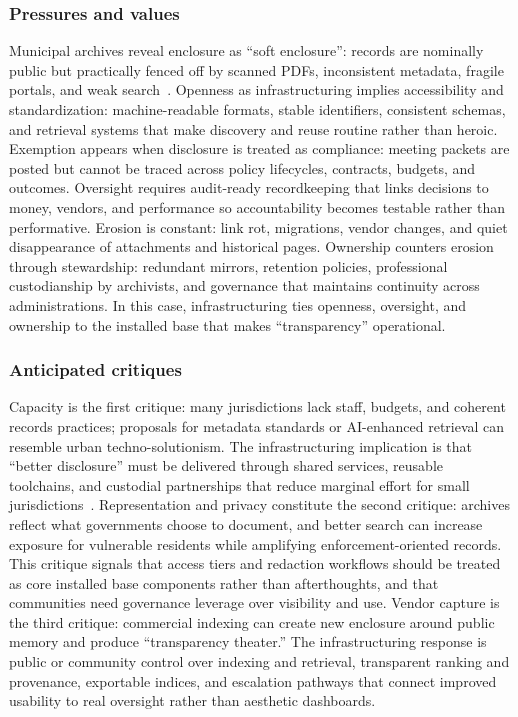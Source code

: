\documentclass[acmsmall,screen]{acmart}
\begin{document}
\subsubsection*{Pressures and values}
Municipal archives reveal enclosure as ``soft enclosure'': records are nominally public but practically fenced off by scanned PDFs, inconsistent metadata, fragile portals, and weak search~\cite{brownCouncilDataProject2021,fuNaturalLanguageProcessing2024}. Openness as infrastructuring implies accessibility and standardization: machine-readable formats, stable identifiers, consistent schemas, and retrieval systems that make discovery and reuse routine rather than heroic. Exemption appears when disclosure is treated as compliance: meeting packets are posted but cannot be traced across policy lifecycles, contracts, budgets, and outcomes. Oversight requires audit-ready recordkeeping that links decisions to money, vendors, and performance so accountability becomes testable rather than performative. Erosion is constant: link rot, migrations, vendor changes, and quiet disappearance of attachments and historical pages. Ownership counters erosion through stewardship: redundant mirrors, retention policies, professional custodianship by archivists, and governance that maintains continuity across administrations. In this case, infrastructuring ties openness, oversight, and ownership to the installed base that makes ``transparency'' operational.

\subsubsection*{Anticipated critiques}
Capacity is the first critique: many jurisdictions lack staff, budgets, and coherent records practices; proposals for metadata standards or AI-enhanced retrieval can resemble urban techno-solutionism. The infrastructuring implication is that ``better disclosure'' must be delivered through shared services, reusable toolchains, and custodial partnerships that reduce marginal effort for small jurisdictions~\cite{warrenRequestAtlasSupportingSlow2025}. Representation and privacy constitute the second critique: archives reflect what governments choose to document, and better search can increase exposure for vulnerable residents while amplifying enforcement-oriented records. This critique signals that access tiers and redaction workflows should be treated as core installed base components rather than afterthoughts, and that communities need governance leverage over visibility and use. Vendor capture is the third critique: commercial indexing can create new enclosure around public memory and produce ``transparency theater.'' The infrastructuring response is public or community control over indexing and retrieval, transparent ranking and provenance, exportable indices, and escalation pathways that connect improved usability to real oversight rather than aesthetic dashboards.
\end{document}
